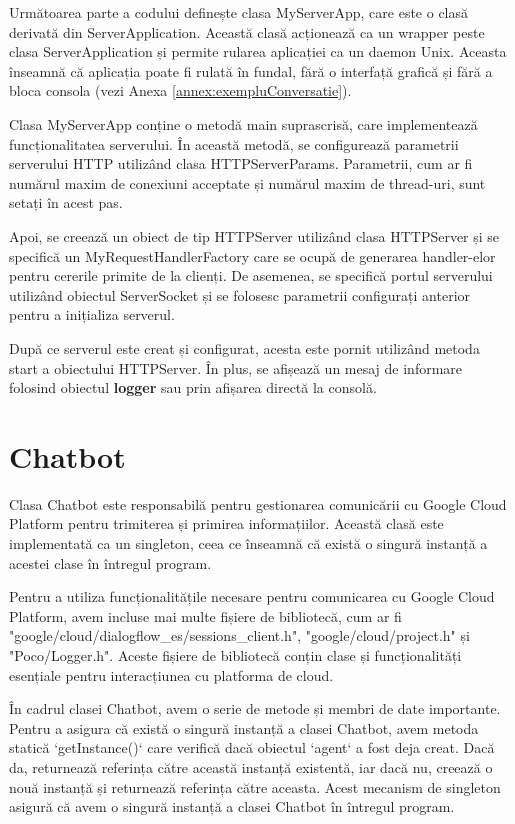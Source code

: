 Următoarea parte a codului definește clasa MyServerApp, care este o clasă derivată din ServerApplication. Această clasă acționează ca un wrapper peste clasa ServerApplication și permite rularea aplicației ca un daemon Unix. Aceasta înseamnă că aplicația poate fi rulată în fundal, fără o interfață grafică și fără a bloca consola (vezi Anexa \ref{annex:exempluConversatie}).

Clasa MyServerApp conține o metodă main suprascrisă, care implementează funcționalitatea serverului. În această metodă, se configurează parametrii serverului HTTP utilizând clasa HTTPServerParams. Parametrii, cum ar fi numărul maxim de conexiuni acceptate și numărul maxim de thread-uri, sunt setați în acest pas.

Apoi, se creează un obiect de tip HTTPServer utilizând clasa HTTPServer și se specifică un MyRequestHandlerFactory care se ocupă de generarea handler-elor pentru cererile primite de la clienți. De asemenea, se specifică portul serverului utilizând obiectul ServerSocket și se folosesc parametrii configurați anterior pentru a inițializa serverul.

După ce serverul este creat și configurat, acesta este pornit utilizând metoda start a obiectului HTTPServer. În plus, se afișează un mesaj de informare folosind obiectul \textbf{logger} sau prin afișarea directă la consolă.

\section{Chatbot}

Clasa Chatbot este responsabilă pentru gestionarea comunicării cu Google Cloud Platform pentru trimiterea și primirea informațiilor. Această clasă este implementată ca un singleton, ceea ce înseamnă că există o singură instanță a acestei clase în întregul program.

Pentru a utiliza funcționalitățile necesare pentru comunicarea cu Google Cloud Platform, avem incluse mai multe fișiere de bibliotecă, cum ar fi "google/cloud/dialogflow\_es/sessions\_client.h", "google/cloud/project.h" și "Poco/Logger.h". Aceste fișiere de bibliotecă conțin clase și funcționalități esențiale pentru interacțiunea cu platforma de cloud.

În cadrul clasei Chatbot, avem o serie de metode și membri de date importante. Pentru a asigura că există o singură instanță a clasei Chatbot, avem metoda statică `getInstance()` care verifică dacă obiectul `agent` a fost deja creat. Dacă da, returnează referința către această instanță existentă, iar dacă nu, creează o nouă instanță și returnează referința către aceasta. Acest mecanism de singleton asigură că avem o singură instanță a clasei Chatbot în întregul program.

